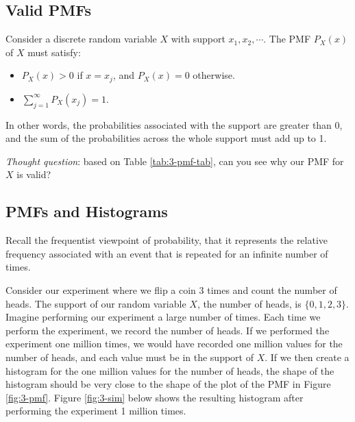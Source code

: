 \documentclass[
]{book}
\providecommand{\tightlist}{%
  \setlength{\itemsep}{0pt}\setlength{\parskip}{0pt}}
\begin{document}
\hypertarget{valid-pmfs}{%
\subsection{Valid PMFs}\label{valid-pmfs}}

Consider a discrete random variable \(X\) with support \(x_1, x_2, \cdots\). The PMF \(P_X(x)\) of \(X\) must satisfy:

\begin{itemize}
\tightlist
\item
  \(P_X(x) > 0\) if \(x = x_j\), and \(P_X(x) = 0\) otherwise.
\item
  \(\sum_{j=1}^{\infty} P_X(x_j) = 1\).
\end{itemize}

In other words, the probabilities associated with the support are greater than 0, and the sum of the probabilities across the whole support must add up to 1.

\emph{Thought question}: based on Table \ref{tab:3-pmf-tab}, can you see why our PMF for \(X\) is valid?

\hypertarget{pmfhist}{%
\subsection{PMFs and Histograms}\label{pmfhist}}

Recall the frequentist viewpoint of probability, that it represents the relative frequency associated with an event that is repeated for an infinite number of times.

Consider our experiment where we flip a coin 3 times and count the number of heads. The support of our random variable \(X\), the number of heads, is \(\{0,1,2,3 \}\). Imagine performing our experiment a large number of times. Each time we perform the experiment, we record the number of heads. If we performed the experiment one million times, we would have recorded one million values for the number of heads, and each value must be in the support of \(X\). If we then create a histogram for the one million values for the number of heads, the shape of the histogram should be very close to the shape of the plot of the PMF in Figure \ref{fig:3-pmf}. Figure \ref{fig:3-sim} below shows the resulting histogram after performing the experiment 1 million times.
\end{document}
